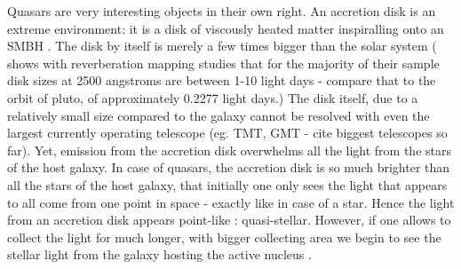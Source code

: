 \documentclass[modern]{aastex62}
\begin{document}
Quasars are very interesting objects in their own right. An accretion disk is an extreme environment: it is a disk of viscously heated matter inspiralling onto an SMBH \citep{ruan2017}. The disk by itself is merely a few times bigger than the solar system (\citep{mudd2017} shows with reverberation mapping studies that for the majority of their sample disk sizes at 2500 angstroms are between 1-10 light days - compare that to the orbit of pluto, of approximately 0.2277 light days.) The disk itself, due to a relatively small size compared to the galaxy cannot be resolved with even the largest currently operating telescope (eg. TMT, GMT - cite biggest telescopes so far).  Yet, emission from the accretion disk overwhelms all the light from the stars of the host galaxy.   In case of quasars, the accretion disk is so much brighter than all the stars of the host galaxy, that initially one only sees the light that appears to all come from one point in space - exactly like in case of a star. Hence the light from an accretion disk appears point-like : quasi-stellar. However,  if one allows to collect the light for much longer, with bigger collecting area  we begin to see the stellar light from the galaxy hosting the active nucleus \citep{hutchings2002,kotilainen2013, falomo2014, liuzzo2016, bayliss2017}. 
\end{document}
